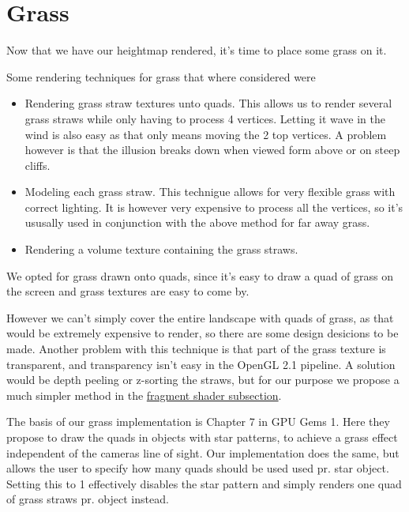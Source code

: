 \chapter{Grass}


Now that we have our heightmap rendered, it's time to place some
grass on it. 

Some rendering techniques for grass that where considered were

\begin{itemize}
\item Rendering grass straw textures unto quads. This allows us to
  render several grass straws while only having to process 4
  vertices. Letting it wave in the wind is also easy as that only
  means moving the 2 top vertices. A problem however is that the
  illusion breaks down when viewed form above or on steep cliffs.
\item Modeling each grass straw. This technigue allows for very
  flexible grass with correct lighting. It is however very expensive
  to process all the vertices, so it's ususally used in conjunction
  with the above method for far away grass.
\item Rendering a volume texture containing the grass straws.
\end{itemize}

We opted for grass drawn onto quads, since it's easy to
draw a quad of grass on the screen and grass textures are easy to come
by. 

However we can't simply cover the entire landscape with quads of
grass, as that would be extremely expensive to render, so there are
some design desicions to be made. Another problem with this technique
is that part of the grass texture is transparent, and transparency
isn't easy in the OpenGL 2.1 pipeline. A solution would be depth
peeling or z-sorting the straws, but for our purpose we propose a much
simpler method in the \hyperref[sec:grassFrag]{fragment shader
  subsection}.


The basis of our grass implementation is Chapter 7 in GPU Gems 1. Here
they propose to draw the quads in objects with star patterns, to
achieve a grass effect independent of the cameras line of sight. Our
implementation does the same, but allows the user to specify how many
quads should be used used pr. star object. Setting this to 1
effectively disables the star pattern and simply renders one quad of
grass straws pr. object instead.

